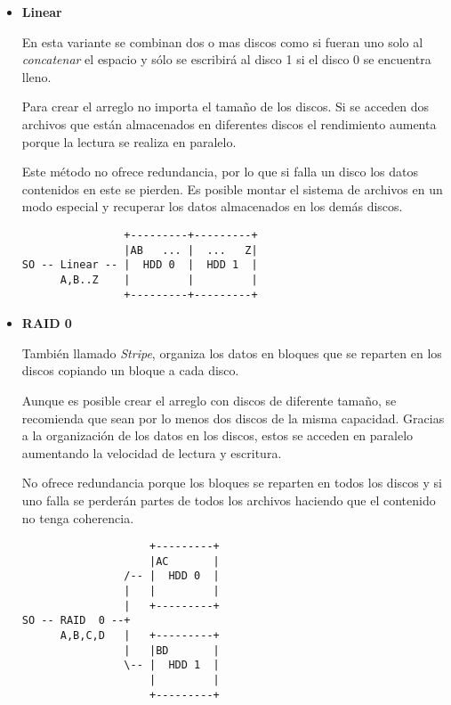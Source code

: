 \begin{itemize}

  \item \textbf{Linear}

En esta variante se combinan dos o mas discos como si fueran uno solo al \emph{concatenar} el espacio y s\'{o}lo se escribir\'{a} al disco 1 si el disco 0 se encuentra lleno.

Para crear el arreglo no importa el tama\~{n}o de los discos. Si se acceden dos archivos que est\'{a}n almacenados en diferentes discos el rendimiento aumenta porque la lectura se realiza en paralelo.

Este m\'{e}todo no ofrece redundancia, por lo que si falla un disco los datos contenidos en este se pierden. Es posible montar el sistema de archivos en un modo especial y recuperar los datos almacenados en los dem\'{a}s discos.

{
\scriptsize
\linespread{1}
\begin{verbatim}
                +---------+---------+
                |AB   ... |  ...   Z|
SO -- Linear -- |  HDD 0  |  HDD 1  |
      A,B..Z    |         |         |
                +---------+---------+
\end{verbatim}
}

  \item \textbf{RAID 0}

Tambi\'{e}n llamado \emph{Stripe}, organiza los datos en bloques que se reparten en los discos copiando un bloque a cada disco.

Aunque es posible crear el arreglo con discos de diferente tama\~{n}o, se recomienda que sean por lo menos dos discos de la misma capacidad. Gracias a la organizaci\'{o}n de los datos en los discos, estos se acceden en paralelo aumentando la velocidad de lectura y escritura.

No ofrece redundancia porque los bloques se reparten en todos los discos y si uno falla se perder\'{a}n partes de todos los archivos haciendo que el contenido no tenga coherencia.

{
\scriptsize
\linespread{1}
\begin{verbatim}
                    +---------+
                    |AC       |
                /-- |  HDD 0  |
                |   |         |
                |   +---------+
SO -- RAID  0 --+
      A,B,C,D   |   +---------+
                |   |BD       |
                \-- |  HDD 1  |
                    |         |
                    +---------+
\end{verbatim}
}


\end{itemize}
